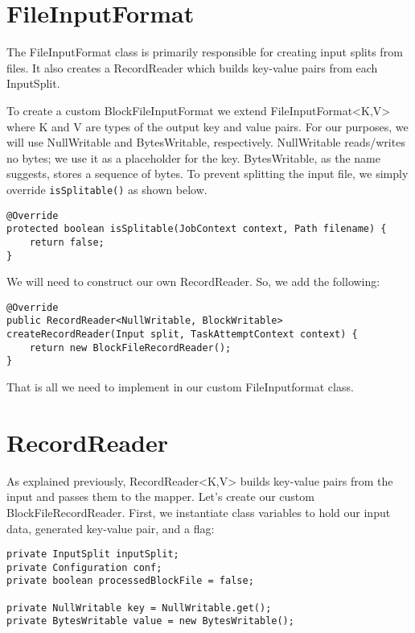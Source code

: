 \documentclass[9pt,twocolumn,twoside]{idsi}
\begin{document}
\section{FileInputFormat}

The FileInputFormat class is primarily responsible for creating input splits from files. It also creates a RecordReader which builds key-value pairs from each InputSplit.

To create a custom BlockFileInputFormat we extend FileInputFormat<K,V> where K and V are types of the output key and value pairs. For our purposes, we will use NullWritable and BytesWritable, respectively. NullWritable reads/writes no bytes; we use it as a placeholder for the key. BytesWritable, as the name suggests, stores a sequence of bytes. To prevent splitting the input file, we simply override \lstinline{isSplitable()} as shown below.

\lstset{language=Java}
\begin{lstlisting}
@Override
protected boolean isSplitable(JobContext context, Path filename) {
    return false;
}
\end{lstlisting}

We will need to construct our own RecordReader. So, we add the following:

\begin{lstlisting}
@Override
public RecordReader<NullWritable, BlockWritable> createRecordReader(Input split, TaskAttemptContext context) {
    return new BlockFileRecordReader();
}
\end{lstlisting}

That is all we need to implement in our custom FileInputformat class.

\section{RecordReader}

As explained previously, RecordReader<K,V> builds key-value pairs from the input and passes them to the mapper. Let's create our custom BlockFileRecordReader. First, we instantiate class variables to hold our input data, generated key-value pair, and a flag:

\begin{lstlisting}
private InputSplit inputSplit;
private Configuration conf;
private boolean processedBlockFile = false;

private NullWritable key = NullWritable.get();
private BytesWritable value = new BytesWritable();
\end{lstlisting}
\end{document}

